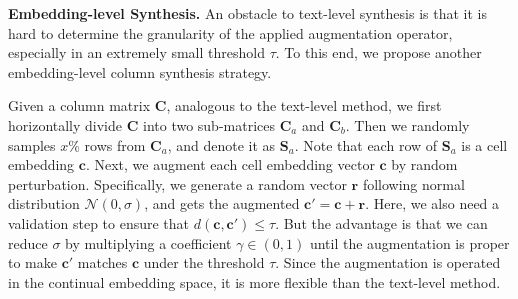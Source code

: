 \vspace{1mm}
\noindent\textbf{Embedding-level Synthesis.}
An obstacle to text-level synthesis is that it is hard to determine the granularity of the applied augmentation operator, especially in an extremely small threshold $\tau$. To this end, we propose another embedding-level column synthesis strategy.

Given a column matrix $\mathbf{C}$, analogous to the text-level method, we first horizontally divide $\mathbf{C}$ into two sub-matrices $\mathbf{C}_a$ and $\mathbf{C}_b$. Then we randomly samples $x\%$ rows from $\mathbf{C}_a$, and denote it as $\mathbf{S}_a$. Note that each row of $\mathbf{S}_a$ is a cell embedding $\mathbf{c}$. Next, we  augment each cell embedding vector $\mathbf{c}$ by random perturbation. Specifically, we generate a random vector $\mathbf{r} $ following normal distribution $\mathcal{N}(0, \sigma)$, and gets the augmented $\mathbf{c}' = \mathbf{c} + \mathbf{r}$. Here, we also need a validation step to ensure that $d(\mathbf{c}, \mathbf{c}') \leq \tau$. But the advantage is that we can reduce $\sigma$ by multiplying a coefficient $\gamma \in (0,1)$ until the augmentation is proper to make $\mathbf{c}'$ matches $\mathbf{c}$ under the threshold $\tau$. Since the augmentation is operated in the continual embedding space, it is more flexible than the text-level method.



 
  
 
